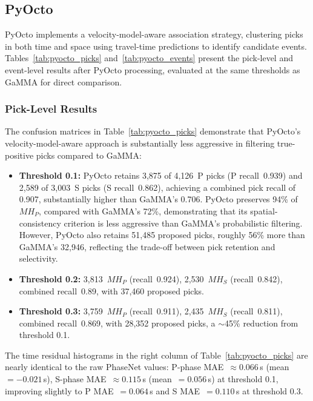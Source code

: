 \newpage
\subsection{PyOcto}
PyOcto implements a velocity-model-aware association strategy, clustering picks
in both time and space using travel-time predictions to identify candidate
events. Tables~\ref{tab:pyocto_picks} and~\ref{tab:pyocto_events} present the
pick-level and event-level results after PyOcto processing, evaluated at the
same thresholds as GaMMA for direct comparison.

\subsubsection{Pick-Level Results}
The confusion matrices in Table~\ref{tab:pyocto_picks} demonstrate that
PyOcto's velocity-model-aware approach is substantially less aggressive in
filtering true-positive picks compared to GaMMA:
\begin{itemize}
  \item \textbf{Threshold 0.1:} PyOcto retains 3,875 of 4,126~P picks (P
    recall~0.939) and 2,589 of 3,003~S picks (S recall~0.862), achieving a
    combined pick recall of 0.907, substantially higher than GaMMA's 0.706.
    PyOcto preserves 94\% of $MH_P$, compared with GaMMA's 72\%, demonstrating
    that its spatial-consistency criterion is less aggressive than GaMMA's
    probabilistic filtering. However, PyOcto also retains 51,485 proposed
    picks, roughly 56\% more than GaMMA's 32,946, reflecting the trade-off
    between pick retention and selectivity.
  \item \textbf{Threshold 0.2:} 3,813~$MH_P$ (recall~0.924), 2,530~$MH_S$
    (recall~0.842), combined recall~0.89, with 37,460 proposed picks.
  \item \textbf{Threshold 0.3:} 3,759~$MH_P$ (recall~0.911), 2,435~$MH_S$
    (recall~0.811), combined recall~0.869, with 28,352 proposed picks, a
    $\sim$45\% reduction from threshold 0.1.
\end{itemize}

The time residual histograms in the right column of
Table~\ref{tab:pyocto_picks} are nearly identical to the raw PhaseNet values:
P-phase MAE~$\approx 0.066$\,s (mean~$= -0.021$\,s), S-phase
MAE~$\approx 0.115$\,s (mean~$=0.056$\,s) at threshold 0.1, improving slightly
to P MAE~$= 0.064$\,s and S MAE~$= 0.110$\,s at threshold 0.3.

